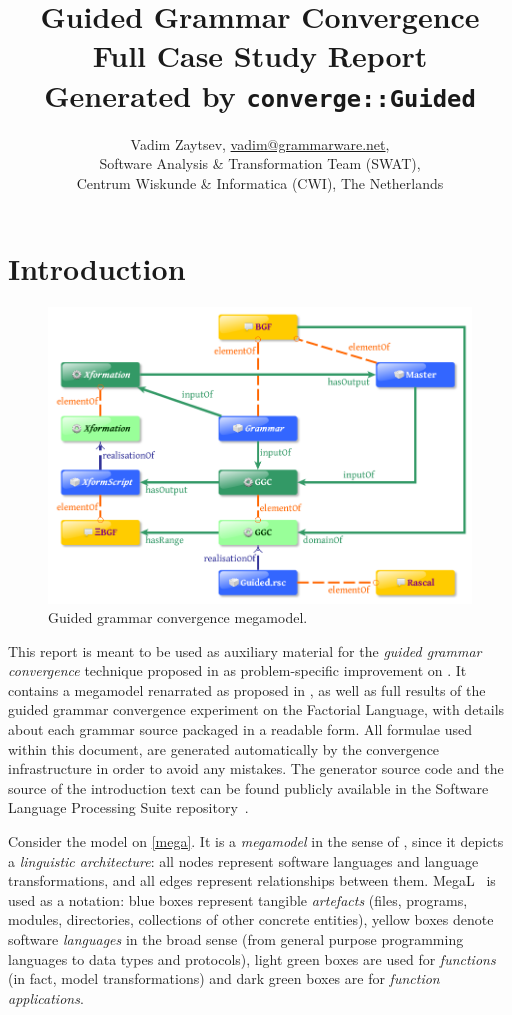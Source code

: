 \documentclass[a4paper]{report}
\author{Vadim Zaytsev, \href{mailto:vadim@grammarware.net}{\url{vadim@grammarware.net}},\\
Software Analysis \& Transformation Team (SWAT),\\Centrum Wiskunde \& Informatica (CWI), The Netherlands}
\title{{\Huge Guided Grammar Convergence}\\Full Case Study Report\\
\Large Generated by \texttt{converge::Guided}}
\begin{document}
\maketitle

\chapter*{Introduction}

\begin{figure}[b!] %
	\centering
		\includegraphics[width=\textwidth]{megamodel.png}
	\caption{Guided grammar convergence megamodel.}
	\label{mega}
\end{figure}

This report is meant to be used as auxiliary material for the \emph{guided grammar convergence} technique proposed in
\cite{Guided2013} as problem-specific improvement on \cite{Convergence2009}. It contains a megamodel renarrated as
proposed in \cite{Renarration2012}, as well as full results of the guided grammar convergence experiment on the
Factorial Language, with details about each grammar source packaged in a readable form. All formulae used within this
document, are generated automatically by the convergence infrastructure in order to avoid any mistakes. The generator
source code and the source of the introduction text can be found publicly available in the Software Language Processing
Suite repository~\cite{SLPS}.

Consider the model on \autoref{mega}. It is a \emph{megamodel} in the sense of \cite{BJV04,FNG04}, since it depicts a
\emph{linguistic architecture}: all nodes represent software languages and language transformations, and all edges
represent relationships between them. MegaL~\cite{MegaL} is used as a notation: blue boxes represent tangible
\emph{artefacts} (files, programs, modules, directories, collections of other concrete entities), yellow boxes denote
software \emph{languages} in the broad sense (from general purpose programming languages to data types and protocols),
light green boxes are used for \emph{functions} (in fact, model transformations) and dark green boxes are for
\emph{function applications}.
\end{document}
